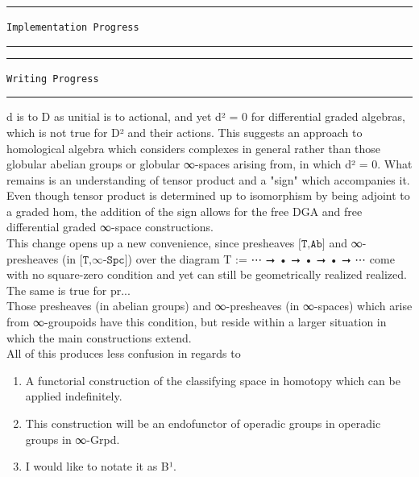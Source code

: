 \documentclass{book}
\theoremstyle{definition}
\begin{document}
\noindent\textcolor{Red}{\rule{16cm}{1mm}}
\begin{center}
\texttt{Implementation Progress}
\end{center}
\noindent\textcolor{Red}{\rule{16cm}{1mm}}

\noindent\textcolor{Red}{\rule{16cm}{1mm}}
\begin{center}
\texttt{Writing Progress}
\end{center}
\noindent\textcolor{Red}{\rule{16cm}{1mm}}

d is to D as unitial is to actional, and yet d² = 0 for differential graded algebras, which is not true for D² and their actions. This suggests an approach to homological algebra which considers complexes in general rather than those globular abelian groups or globular ∞-spaces arising from, in which d² = 0. What remains is an understanding of tensor product and a "sign" which accompanies it. Even though tensor product is determined up to isomorphism by being adjoint to a graded hom, the addition of the sign allows for the free DGA and free differential graded ∞-space constructions.\\

This change opens up a new convenience, since presheaves $\texttt{[T,Ab]}$ and ∞-presheaves (in $\texttt{[T,∞-Spc]}$) over the diagram T := ⋯ ⭢ • ⭢ • ⭢ • ⭢ ⋯ come with no square-zero condition and yet can still be geometrically realized realized. The same is true for pr...\\

 Those presheaves (in abelian groups) and ∞-presheaves (in ∞-spaces) which arise from ∞-groupoids have this condition, but reside within a larger situation in which the main constructions extend.\\

All of this produces less confusion in regards to \\

\begin{enumerate}
\item A functorial construction of the classifying space in homotopy which can be applied indefinitely.
\item This construction will be an endofunctor of operadic groups in operadic groups in ∞-Grpd.
\item I would like to notate it as B¹. 
\end{enumerate}
\end{document}
